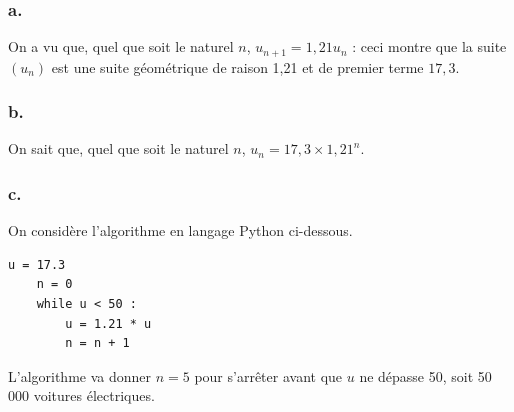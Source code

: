 \documentclass[10pt]{article}
\begin{document}
	\subsubsection*{a.}
	
	On a vu que, quel que soit le naturel \(n\), \(u_{n+1} = 1,21u_n\) : ceci montre que la suite \((u_n)\) est une suite géométrique de raison 1,21 et de premier terme \(17,3\).
	
	\subsubsection*{b.}
	
	On sait que, quel que soit le naturel \(n\), \(u_n = 17,3 \times 1,21^n\).
	
	\subsubsection*{c.}
	
	On considère l'algorithme en langage Python ci-dessous.
	
	\begin{lstlisting}[style=python]
	u = 17.3
	n = 0
	while u < 50 :
		u = 1.21 * u
		n = n + 1
	\end{lstlisting}
	
	L'algorithme va donner \(n = 5\) pour s'arrêter avant que \(u\) ne dépasse 50, soit 50 000 voitures électriques.
\end{document}
